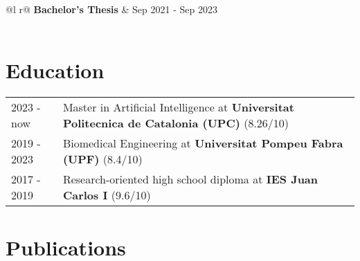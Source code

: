\documentclass[a4paper,12pt]{article}
\begin{document}
\begin{tabularx}{\linewidth}{ @{}l r@{} }
\textbf{Bachelor's Thesis} & \hfill Sep 2021 - Sep 2023 \\[3.75pt]
  \\
\end{tabularx}

\section{Education}
\begin{tabularx}{\linewidth}{@{}l X@{}}	
2023 - now & Master in Artificial Intelligence at \textbf{Universitat Politecnica de Catalonia (UPC)} \hfill \normalsize (8.26/10) \\
2019 - 2023 & Biomedical Engineering at \textbf{Universitat Pompeu Fabra (UPF)} \hfill (8.4/10) \\ 
2017 - 2019 & Research-oriented high school diploma at \textbf{IES Juan Carlos I} \hfill (9.6/10) \\
\end{tabularx}

\section{Publications}
\begin{refsection}
\nocite{UTI2024}
\nocite{honey2023}
\nocite{wine2022}
\printbibliography[heading=none]
\end{refsection}

\vfill
{}
\end{document}
